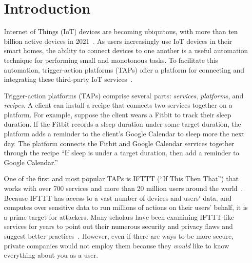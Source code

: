 \section{Introduction}
\label{sec:intro}

Internet of Things (IoT) devices are becoming ubiquitous, with more than ten
billion active devices in 2021~\cite{DBLP:webpage/Bojan/IoTstats}. As users
increasingly use IoT devices in their smart homes, the ability to connect
devices to one another is a useful automation technique for performing small and
monotonous tasks. To facilitate this automation, trigger-action platforms (TAPs)
offer a platform for connecting and integrating these third-party IoT
services~\cite{DBLP:journals/access/XuZZCDG19, DBLP:conf/chi/UrHBLMPSL16}.

Trigger-action platforms (TAPs) comprise several parts: \emph{services},
\emph{platforms}, and \emph{recipes}. A client can install a recipe that
connects two services together on a platform. For example, suppose the client
wears a Fitbit to track their sleep duration. If the Fitbit records a sleep
duration under some target duration, the platform adds a reminder to the
client's Google Calendar to sleep more the next day. The platform connects the
Fitbit and Google Calendar services together through the recipe ``If sleep is
under a target duration, then add a reminder to Google Calendar.'' 

One of the first and most popular TAPs is IFTTT (``If This Then That'') that
works with over 700 services and more than 20 million users around the
world~\cite{ifttt-website, DBLP:conf/sp/ChenCWSCF21}.  Because IFTTT has access
to a vast number of devices and users' data, and computes over sensitive data to
run millions of actions on their users' behalf, it is a prime target for
attackers. Many scholars have been examining IFTTT-like services for years to
point out their numerous security and privacy flaws and suggest better
practices~\cite{DBLP:conf/sp/ChenCWSCF21, DBLP:journals/corr/abs-2009-12447,
  DBLP:conf/imc/MiQZW17, DBLP:journals/corr/FernandesRJP17,
  DBLP:conf/www/SurbatovichABDJ17, DBLP:journals/access/XuZZCDG19}.  However,
even if there are ways to be more secure, private companies would not employ
them because they \emph{would} like to know everything about you as a user.

